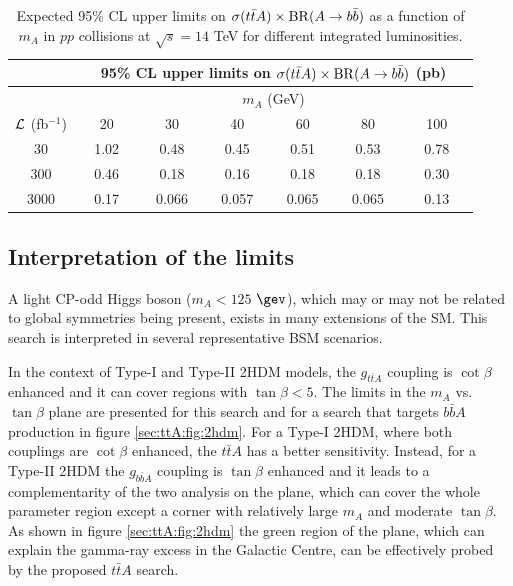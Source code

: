 \begin{table}[htb!]\footnotesize
\begin{center} 
\begin{tabular}{ccccccc} 
\hline\hline
 & \multicolumn{6}{c}{95\% CL upper limits on $\sigma(t\bar{t} A) \times {\rm BR}(A\to b\bar{b})$ (pb)} \\
\hline
  & \multicolumn{6}{c}{$m_A$ (GeV)} \\
  \cline{2-7} 
${\cal L}$ (fb$^{-1}$) & $\quad$ 20 $\quad$ & $\quad$ 30 $\quad$ & $\quad$ 40 $\quad$ & $\quad$ 60 $\quad$ & $\quad$ 80 $\quad$ & $\quad$ 100 $\quad$ \\
\hline
30 & 1.02 & 0.48 & 0.45 & 0.51 & 0.53 & 0.78  \\
300 & 0.46 & 0.18 & 0.16 & 0.18 & 0.18 & 0.30 \\
3000 & 0.17 & 0.066 & 0.057 & 0.065 & 0.065 & 0.13 \\
\hline\hline
\end{tabular} 
\captionsetup{width=0.85\textwidth} \caption{\small Expected 95\% CL upper limits on $\sigma(t\bar{t} A) \times {\rm BR}(A\to b\bar{b})$ as a function of $m_A$ in $pp$ collisions at $\sqrt{s}=14$ TeV for different integrated luminosities.}
\label{sec:ttA:tab:sigma_95CL} 
\end{center} 
\end{table} 


\subsection{Interpretation of the limits}

A light CP-odd Higgs boson ($m_{A}<125$ $\gev$), which may or may not be related to global symmetries being present, exists in many extensions of the SM. This search is interpreted in several representative BSM scenarios. 

In the context of Type-I and Type-II 2HDM models, the $g_{t\bar{t}A}$ coupling is $\cot\beta$ enhanced and it can cover regions with $\tan\beta<5$. The limits in the $m_{A}$ vs. $\tan\beta$ plane are presented for this search and for a search that targets $b\bar{b}A$ production \cite{Kozaczuk:2015bea} in figure \ref{sec:ttA:fig:2hdm}. For a Type-I 2HDM, where both couplings are $\cot\beta$ enhanced, the $t\bar{t}A$ has a better sensitivity. Instead, for a Type-II 2HDM  the $g_{b\bar{b}A}$ coupling is $\tan\beta$ enhanced and it leads to a complementarity of the two analysis on the plane, which can cover the whole parameter region except a corner with relatively large $m_{A}$ and moderate $\tan\beta$. As shown in figure \ref{sec:ttA:fig:2hdm} the green region of the plane, which can explain the gamma-ray excess in the Galactic Centre, can be effectively probed by the proposed $t\bar{t}A$ search.


